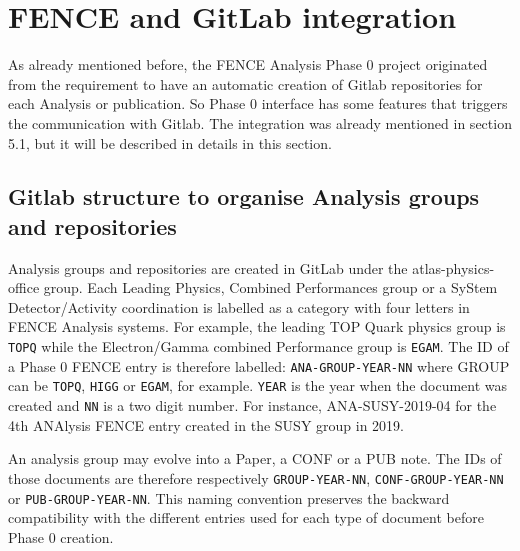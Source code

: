 
\section{FENCE and GitLab integration}%
\label{sec:FENCE_and_Gitlab_integration}

As already mentioned before, the FENCE Analysis Phase 0 project originated from the requirement to have an automatic creation of Gitlab repositories for each Analysis or publication. So Phase 0 interface has some features that triggers the communication with Gitlab. The integration was already mentioned in section 5.1, but it will be described in details in this section.

\subsection{Gitlab structure to organise Analysis groups and repositories}%
\label{sec:Gitlab_structure_to_organise_Analysis_groups_and_repositories}
Analysis groups and repositories are created in GitLab under the atlas-physics-office group. Each Leading Physics, Combined Performances group or a SyStem Detector/Activity coordination is labelled as a category with four letters in FENCE Analysis systems.
For example, the leading TOP Quark physics group is \texttt{TOPQ} while the Electron/Gamma combined Performance group is \texttt{EGAM}. The ID of a Phase 0 FENCE entry is therefore labelled: \texttt{ANA-GROUP-YEAR-NN} where GROUP can be \texttt{TOPQ}, \texttt{HIGG} or \texttt{EGAM}, for example.
\texttt{YEAR} is the year when the document was created and \texttt{NN} is a two digit number.
For instance, ANA-SUSY-2019-04 for the 4th ANAlysis FENCE entry created in the SUSY group in 2019.
                    
An analysis group may evolve into a Paper, a CONF or a PUB note. The IDs of those documents are therefore respectively \texttt{GROUP-YEAR-NN}, \texttt{CONF-GROUP-YEAR-NN} or \texttt{PUB-GROUP-YEAR-NN}.
This naming convention preserves the backward compatibility with the different entries used for each type of document before Phase 0 creation.

